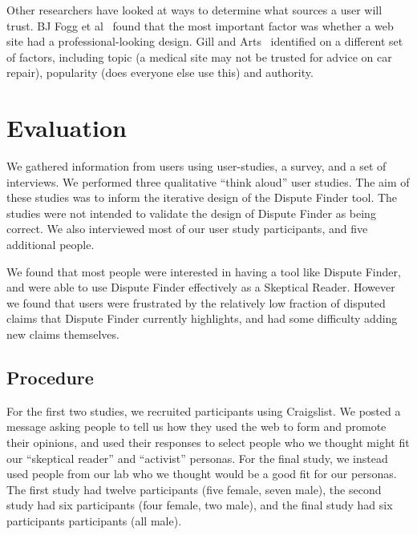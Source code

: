 \documentclass{www2010-submission}
\newcommand{\todo}[1]{}
\begin{document}
\todo{Cite Pew Research study saying people like to read news that supports their own point of view, but many others like neutral sources. http://people-press.org/report/?pageid=1353}

Other researchers have looked at ways to determine what sources a user will trust. 
BJ Fogg et al~\cite{Fogg2003} found that the most important factor was whether a web site had a professional-looking design. Gill and Arts~\cite{Gil2006} identified on a different set of factors, including topic (a medical site may not be trusted for advice on car repair), popularity (does everyone else use this) and authority.


\section{Evaluation}

We gathered information from users using user-studies, a survey, and a set of interviews. We performed three qualitative ``think aloud'' user studies. The aim of these studies was to inform the iterative design of the Dispute Finder tool. The studies were not intended to validate the design of Dispute Finder as being correct. We also interviewed most of our user study participants, and five additional people.

We found that most people were interested in having a tool like Dispute Finder, and were able to use Dispute Finder effectively as a Skeptical Reader. However we found that users were frustrated by the relatively low fraction of disputed claims that Dispute Finder currently highlights, and had some difficulty adding new claims themselves.


\subsection{Procedure}

For the first two studies, we recruited participants using Craigslist. We posted a message asking people to tell us how they used the web to form and promote their opinions, and used their responses to select people who we thought might fit our ``skeptical reader'' and ``activist'' personas. For the final study, we instead used people from our lab who we thought would be a good fit for our personas. The first study had twelve participants (five female, seven male), the second study had six participants (four female, two male), and the final study had six participants participants (all male). 
\end{document}
